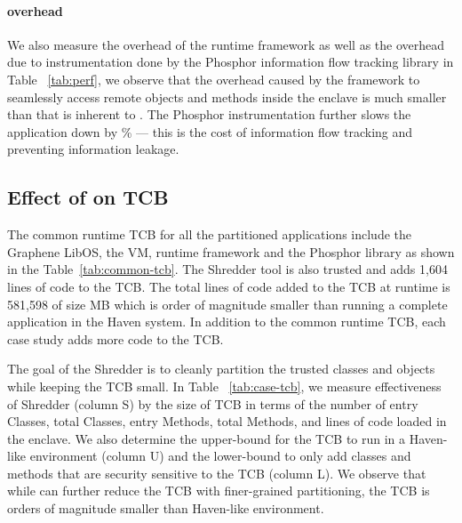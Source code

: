 \paragraph{\sysname{} overhead}
We also measure the overhead of the \sysname{} runtime framework as well as the 
overhead due to instrumentation done by the Phosphor information flow tracking library in Table ~\ref{tab:perf}, we observe that the overhead caused by the \sysname{} framework to seamlessly access remote objects and methods inside the enclave is much smaller than that is inherent to \sgx{}. The Phosphor instrumentation further slows the application down by \% --- this is the cost of information flow tracking and preventing information leakage. 
\subsection{Effect of \sysname{} on TCB}

The common runtime TCB for all the partitioned applications include the Graphene LibOS, 
the \java{} VM, \sysname{} runtime framework and the Phosphor library as shown in the 
Table~\ref{tab:common-tcb}. The \sysname{} Shredder tool is also trusted and 
adds 1,604 lines of code to the TCB. The total lines of code added to the TCB at runtime is 581,598 of size MB which is order of magnitude smaller than running a complete \java{} application in the Haven system.
In addition to the common runtime TCB, each case study adds more code to the TCB.


The goal of the \sysname{} Shredder is to cleanly partition the trusted classes and objects while keeping the TCB small. 
In Table ~\ref{tab:case-tcb}, we measure effectiveness of Shredder (column S) by the size of TCB in terms of the number of entry Classes, total Classes, entry Methods, total Methods, and lines of code loaded in the enclave. 
We also determine the upper-bound for the TCB to run in a Haven-like environment (column U) and the lower-bound to only add classes and methods that are security sensitive to the TCB (column L). We observe that while \sysname{} can further reduce the TCB with finer-grained partitioning, the TCB is orders of magnitude smaller than Haven-like environment.

